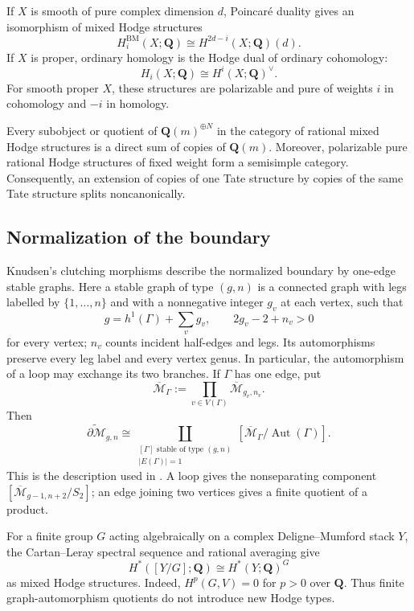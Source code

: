 \documentclass[12pt,reqno]{amsart}
\newcommand{\Q}{\mathbf{Q}}
\newcommand{\M}{\mathcal{M}}
\newcommand{\Mbar}{\overline{\mathcal{M}}}
\newcommand{\BM}{\mathrm{BM}}
\newcommand{\Aut}{\operatorname{Aut}}
\theoremstyle{definition}
\theoremstyle{remark}
\begin{document}
If $X$ is smooth of pure complex dimension $d$, Poincar\'e duality gives an
isomorphism of mixed Hodge structures
\begin{equation}\label{eq:pd-smooth}
 H_i^{\BM}(X;\Q)\cong H^{2d-i}(X;\Q)(d).
\end{equation}
If $X$ is proper, ordinary homology is the Hodge dual of ordinary
cohomology:
\begin{equation}\label{eq:proper-dual}
 H_i(X;\Q)\cong H^i(X;\Q)^\vee.
\end{equation}
For smooth proper $X$, these structures are polarizable and pure of weights
$i$ in cohomology and $-i$ in homology.

Every subobject or quotient of $\Q(m)^{\oplus N}$ in the category of
rational mixed Hodge structures is a direct sum of copies of $\Q(m)$.
Moreover, polarizable pure rational Hodge structures of fixed weight form a
semisimple category.  Consequently, an extension of copies of one Tate
structure by copies of the same Tate structure splits noncanonically.

\subsection{Normalization of the boundary}

Knudsen's clutching morphisms \cite{Knudsen} describe the normalized
boundary by one-edge stable graphs.  Here a stable graph of type $(g,n)$ is
a connected graph with legs labelled by $\{1,\ldots,n\}$ and with a
nonnegative integer $g_v$ at each vertex, such that
\[
 g=h^1(\Gamma)+\sum_v g_v,
 \qquad 2g_v-2+n_v>0
\]
for every vertex; $n_v$ counts incident half-edges and legs.  Its
automorphisms preserve every leg label and every vertex genus.  In
particular, the automorphism of a loop may exchange its two branches.
If $\Gamma$ has one edge, put
\[
 \Mbar_\Gamma:=\prod_{v\in V(\Gamma)}\Mbar_{g_v,n_v}.
\]
Then
\begin{equation}\label{eq:boundary-graphs}
 \widetilde{\partial\M}_{g,n}
 \cong
 \coprod_{\substack{[\Gamma]\text{ stable of type }(g,n)\\
                     |E(\Gamma)|=1}}
 \left[\Mbar_\Gamma/\Aut(\Gamma)\right].
\end{equation}
This is the description used in \cite[Section~2.1]{CLP}.  A loop gives the
nonseparating component $[\Mbar_{g-1,n+2}/S_2]$; an edge joining two
vertices gives a finite quotient of a product.

For a finite group $G$ acting algebraically on a complex Deligne--Mumford
stack $Y$, the Cartan--Leray spectral sequence and rational averaging give
\begin{equation}\label{eq:quotient-invariants}
 H^*([Y/G];\Q)\cong H^*(Y;\Q)^G
\end{equation}
as mixed Hodge structures.  Indeed, $H^p(G,V)=0$ for $p>0$ over $\Q$.
Thus finite graph-automorphism quotients do not introduce new Hodge types.
\end{document}
